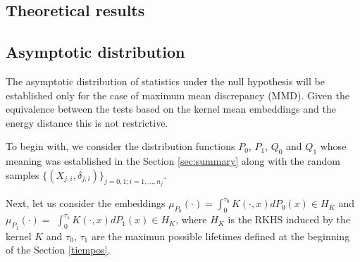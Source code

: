 \documentclass[11pt]{article}
\begin{document}
\begin{appendices}






\section{Theoretical results}
\label{appendix:proof}



\subsection{Asymptotic  distribution}


The asymptotic  distribution of statistics  under the null hypothesis will be established only for the case of maximum mean discrepancy (MMD). Given the equivalence between the tests based on the kernel mean embeddings and the energy distance \cite{sejdinovic2013equivalence}  this is not restrictive.

%

To begin with, we consider the distribution functions $P_0$, $P_1$, $Q_0$ and $Q_1$ whose meaning was established in the Section \ref{sec:summary} along with the random samples	$\{(X_{j,i},\delta_{j,i})\}_{j=0,1; i=1,\dots,n_j}$.

	Next, let us consider the embeddings $\mu_{P_0}(\cdot)=\int_{0}^{\tau_{0}} K(\cdot,x) dP_{0}(x)\in H_{K}$ and  $\mu_{P_1}(\cdot)=$ $\int_{0}^{\tau_{1}} K(\cdot,x) dP_{1}(x)\in H_{K}$, where $H_{K}$ is the RKHS induced by the kernel $K$ and $\tau_0$, $\tau_1$ are the maximun possible lifetimes defined at the beginning of the Section \ref{tiempos}.



\end{appendices}
\end{document}

